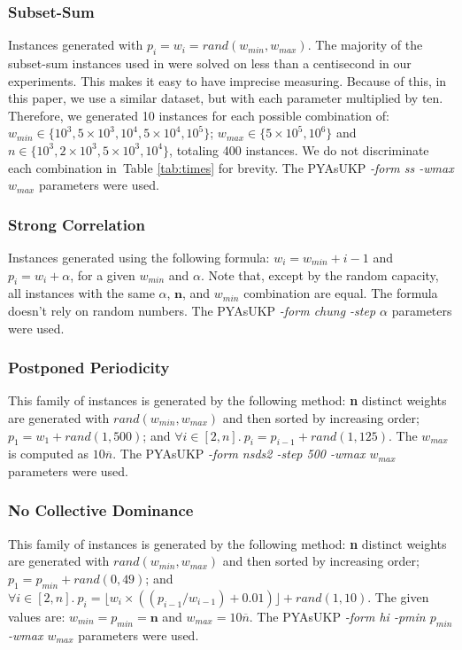 \documentclass[runningheads,a4paper]{llncs}
\begin{document}
\subsubsection{Subset-Sum}\label{sec:subsetsum}
Instances generated with \(p_i = w_i = rand(w_{min}, w_{max})\). 
The majority of the subset-sum instances used in \cite{pya} were solved on less than a centisecond in our experiments. 
This makes it easy to have imprecise measuring. 
Because of this, in this paper, we use a similar dataset, but with each parameter multiplied by ten. 
Therefore, we generated 10 instances for each possible combination of: \(w_{min} \in \{10^3, 5\times10^3, 10^4, 5\times10^4, 10^5\}\); \(w_{max} \in \{5\times10^5, 10^6\}\) and \(n \in \{10^3, 2\times10^3, 5\times10^3, 10^4\}\), totaling 400 instances. We do not discriminate each combination in~Table \ref{tab:times} for brevity. The PYAsUKP \emph{-form ss -wmax \(w_{max}\)} parameters were used.

\subsubsection{Strong Correlation}
Instances generated using the following formula: \(w_i = w_{min} + i - 1\) and \(p_i = w_i + \alpha\), for a given \(w_{min}\) and \(\alpha\).  Note that, except by the random capacity, all instances with the same \(\alpha\), \(\mathbf{n}\), and \(w_{min}\) combination are equal. The formula doesn't rely on random numbers. The PYAsUKP \emph{-form chung -step \(\alpha\) } parameters were used.

\subsubsection{Postponed Periodicity}
This family of instances is generated by the following method: \textbf{n} distinct weights are generated with \(rand(w_{min}, w_{max})\) and then sorted by increasing order; \(p_1 = w_1 + rand(1, 500)\); and \(\forall i \in [2, n].~p_i = p_{i-1} + rand(1, 125)\). The \(w_{max}\) is computed as \(10\overline{n}\). The PYAsUKP \emph{-form nsds2 -step 500 -wmax \(w_{max}\)} parameters were used.

\subsubsection{No Collective Dominance}
This family of instances is generated by the following method: \textbf{n} distinct weights are generated with \(rand(w_{min}, w_{max})\) and then sorted by increasing order; \(p_1 = p_{min} + rand(0, 49)\); and \(\forall i \in [2, n].~p_i = \lfloor w_i \times ((p_{i-1}/w_{i-1}) + 0.01)\rfloor + rand(1, 10)\). The given values are: \(w_{min} = p_{min} = \mathbf{n}\) and \(w_{max} = 10\overline{n}\). The PYAsUKP \emph{-form hi -pmin \(p_{min}\) -wmax \(w_{max}\)} parameters were used.
\end{document}
